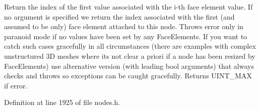 Return the index of the first value associated with the i-\/th face element value. If no argument is specified we return the index associated with the first (and assumed to be only) face element attached to this node. Throws error only in paranoid mode if no values have been set by any Face\+Elements. If you want to catch such cases gracefully in all circumstances (there are examples with complex unstructured 3D meshes where it\textquotesingle{}s not clear a priori if a node has been resized by Face\+Elements) use alternative version (with leading bool arguments) that always checks and throws so exceptions can be caught gracefully. Returns U\+I\+N\+T\+\_\+\+M\+AX if error. 



Definition at line 1925 of file nodes.\+h.



